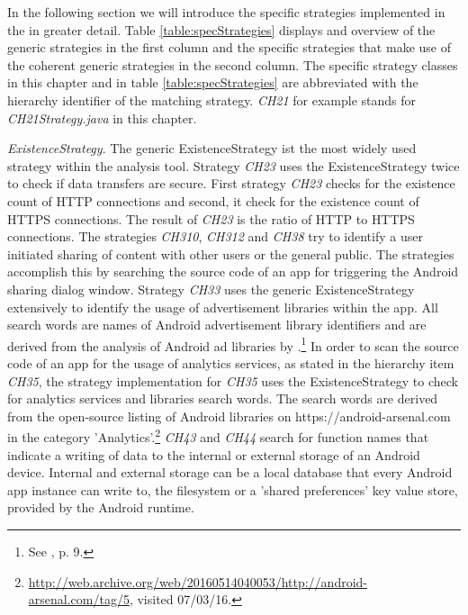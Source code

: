 In the following section we will introduce the specific strategies implemented in the \aiprat in greater detail.
Table \ref{table:specStrategies} displays and overview of the generic strategies in the first column and the specific strategies that make use of the coherent generic strategies in the second column.
The specific strategy classes in this chapter and in table \ref{table:specStrategies} are abbreviated with the \ipp hierarchy identifier of the matching strategy. 
\textit{CH21} for example stands for \textit{CH21\textunderscore Strategy.java} in this chapter.

\textit{ExistenceStrategy}.
The generic ExistenceStrategy ist the most widely used strategy within the analysis tool.
Strategy \textit{CH23} uses the ExistenceStrategy twice to check if data transfers are secure. 
First strategy \textit{CH23} checks for the existence count of HTTP connections and second, it check for the existence count of HTTPS connections.
The result of \textit{CH23} is the ratio of \acs{HTTP} to \acs{HTTPS} connections.
The strategies \textit{CH310}, \textit{CH312} and \textit{CH38} try to identify a user initiated sharing of content with other users or the general public.
The strategies accomplish this by searching the source code of an app for triggering the Android sharing dialog window.
Strategy \textit{CH33} uses the generic ExistenceStrategy extensively to identify the usage of advertisement libraries within the app.
All search words are names of Android advertisement library identifiers and are derived from the analysis of Android ad libraries by \cite{Book2013}.\footnote{See \cite{Book2013}, p. 9.}
In order to scan the source code of an app for the usage of analytics services, as stated in the hierarchy item \textit{CH35}, the strategy implementation for \textit{CH35} uses the ExistenceStrategy to check for analytics services and libraries search words.
The search words are derived from the open-source listing of Android libraries on https://android-arsenal.com in the category 'Analytics'.\footnote{\url{http://web.archive.org/web/20160514040053/http://android-arsenal.com/tag/5}, visited 07/03/16.}
\textit{CH43} and \textit{CH44} search for function names that indicate a writing of data to the internal or external storage of an Android device.
Internal and external storage can be a local database that every Android app instance can write to, the filesystem or a 'shared preferences' key value store, provided by the Android runtime.
